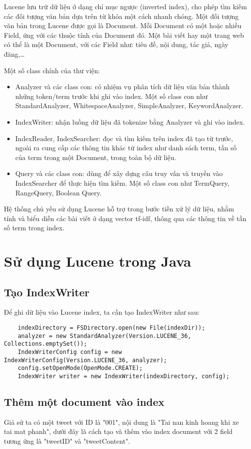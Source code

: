 Lucene lưu trữ dữ liệu ở dạng chỉ mục ngược (inverted index), cho phép tìm kiếm các đối tượng văn bản dựa trên từ khóa một cách nhanh chóng. Một đối tượng văn bản trong Lucene được gọi là Document. Mỗi Document có một hoặc nhiều Field, ứng với các thuộc tính của Document đó. Một bài viết hay một trang web có thể là một Document, với các Field như: tiêu đề, nội dung, tác giả, ngày đăng,…

Một số class chính của thư viện:
\begin{itemize}
	\item Analyzer và các class con: có nhiệm vụ phân tích dữ liệu văn bản thành những token/term trước khi ghi vào index. Một số class con như StandardAnalyzer, WhitespaceAnalyzer, SimpleAnalyzer, KeywordAnalyzer.
	\item IndexWriter: nhận luồng dữ liệu đã tokenize bằng Analyzer và ghi vào index.
	\item IndexReader, IndexSearcher: đọc và tìm kiếm trên index đã tạo từ trước, ngoài ra cung cấp các thông tin khác từ index như danh sách term, tần số của term trong một Document, trong toàn bộ dữ liệu.
	\item Query và các class con: dùng để xây dựng câu truy vấn và truyền vào IndexSearcher để thực hiện tìm kiếm. Một số class con như TermQuery, RangeQuery, Boolean Query. 
\end{itemize}

Hệ thống chủ yếu sử dụng Lucene hỗ trợ trong bước tiền xử lý dữ liệu, nhằm tính và biểu diễn các bài viết ở dạng vector tf-idf, thông qua các thông tin về tần số term trong index.

\section*{Sử dụng Lucene trong Java}
	\subsection*{Tạo IndexWriter}
	Để ghi dữ liệu vào Lucene index, ta cần tạo IndexWriter như sau:
		\begin{lstlisting}
	indexDirectory = FSDirectory.open(new File(indexDir)); 
	analyzer = new StandardAnalyzer(Version.LUCENE_36, Collections.emptySet());
	IndexWriterConfig config = new IndexWriterConfig(Version.LUCENE_36, analyzer);
	config.setOpenMode(OpenMode.CREATE);
	IndexWriter writer = new IndexWriter(indexDirectory, config);
		\end{lstlisting}
	\subsection*{Thêm một document vào index}
	Giả sử ta có một tweet với ID là "001", nội dung là "Tai nan kinh hoang khi xe tai mat phanh", dưới đây là cách tạo và thêm vào index document với 2 field tương ứng là "tweetID" và "tweetContent".
	
